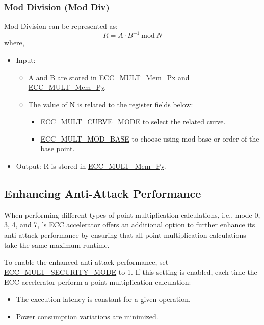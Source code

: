\documentclass[main\_\_EN.tex]{subfiles}
\begin{document}
\subsubsection{Mod Division (Mod Div)}
Mod Division can be represented as:
\[
R = A \cdot {B}^{-1} \ \textrm{mod}\ N
\]
where,
\begin{itemize}
    \item Input:
    \begin{itemize}
        \item A and B are stored in \hyperref[tab:ecc-memory]{ECC\_MULT\_Mem\_Px} and \hyperref[tab:ecc-memory]{ECC\_MULT\_Mem\_Py}.
        \item The value of N is related to the register fields below:
        \begin{itemize}
            \item \hyperref[fielddesc:ECCMULTCURVEMODE]{ECC\_MULT\_CURVE\_MODE} to select the related curve.
            \item \hyperref[fielddesc:ECCMULTMODBASE]{ECC\_MULT\_MOD\_BASE} to choose using mod base or order of the base point.
        \end{itemize}
    \end{itemize}
    \item Output: R is stored in \hyperref[tab:ecc-memory]{ECC\_MULT\_Mem\_Py}.
\end{itemize}

\subsection{Enhancing Anti-Attack Performance}
\label{sec:ecc-anti-attack}

When performing different types of point multiplication calculations, i.e., mode 0, 3, 4, and 7, \chipname{}'s ECC accelerator offers an additional option to further enhance its anti-attack performance by ensuring that all point multiplication calculations take the same maximum runtime.

To enable the enhanced anti-attack performance, set \hyperref[fielddesc:ECCMULTSECURITYMODE]{ECC\_MULT\_SECURITY\_MODE} to 1. If this setting is enabled, each time the ECC accelerator perform a point multiplication calculation:

\begin{itemize}
    \item The execution latency is constant for a given operation.
    \item Power consumption variations are minimized.
\end{itemize}
\end{document}
